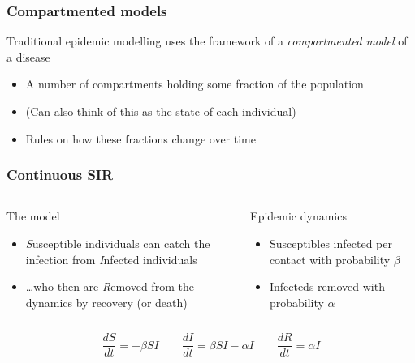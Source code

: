 \documentclass{beamer}
\begin{document}
\begin{frame}
  \frametitle{Compartmented models}

  \begin{block}{Traditional epidemic modelling uses the framework of a
      \emph{compartmented model} of a disease}
    \begin{itemize}
    \item A number of compartments holding some fraction of the
      population
    \item (Can also think of this as the state of each individual)
    \item Rules on how these fractions change over time
    \end{itemize}
  \end{block}
\end{frame}

\begin{frame}
  \frametitle{Continuous SIR}
  
  \begin{columns}
    \begin{column}[t]{.45\textwidth}
      \begin{block}{The model}
          \begin{itemize}
          \item \emph{S}usceptible individuals can catch the infection
            from \emph{I}nfected individuals
          \item \ldots who then are \emph{R}emoved from the dynamics
            by recovery (or death) 
          \end{itemize}
        \end{block}
      \end{column}

      \begin{column}[t]{.45\textwidth}
        \begin{block}{Epidemic dynamics}
          \begin{itemize}
          \item Susceptibles infected per contact with probability
            $\beta$
          \item Infecteds removed with probability $\alpha$ 
          \end{itemize}
        \end{block}
      \end{column}
  \end{columns}

  \vspace{.5cm}
  $$
  \frac{dS}{dt} = -\beta SI \qquad
  \frac{dI}{dt} = \beta SI - \alpha I \qquad
  \frac{dR}{dt} = \alpha I
  $$
\end{frame}
\end{document}

